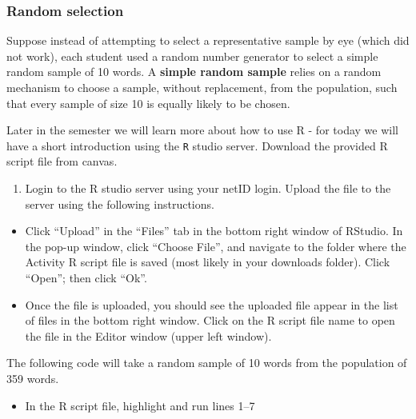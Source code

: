 \documentclass[
]{report}
\newenvironment{Shaded}{\begin{snugshade}}{\end{snugshade}}
\newcommand{\DecValTok}[1]{\textcolor[rgb]{0.00,0.00,0.81}{#1}}
\newcommand{\FunctionTok}[1]{\textcolor[rgb]{0.13,0.29,0.53}{\textbf{#1}}}
\newcommand{\NormalTok}[1]{#1}
\newcommand{\SpecialCharTok}[1]{\textcolor[rgb]{0.81,0.36,0.00}{\textbf{#1}}}
\providecommand{\tightlist}{%
  \setlength{\itemsep}{0pt}\setlength{\parskip}{0pt}}
\begin{document}
\subsubsection*{Random selection}\label{random-selection}

Suppose instead of attempting to select a representative sample by eye (which did not work), each student used a random number generator to select a simple random sample of 10 words. A \textbf{simple random sample} relies on a random mechanism to choose a sample, without replacement, from the population, such that every sample of size 10 is equally likely to be chosen.

Later in the semester we will learn more about how to use R - for today we will have a short introduction using the \texttt{R} studio server. Download the provided R script file from canvas.

\begin{enumerate}
\def\labelenumi{\arabic{enumi}.}
\setcounter{enumi}{4}
\tightlist
\item
  Login to the R studio server using your netID login. Upload the file to the server using the following instructions.
\end{enumerate}

\begin{itemize}
\item
  Click ``Upload'' in the ``Files'' tab in the bottom right window of RStudio. In the pop-up window, click ``Choose File'', and navigate to the folder where the Activity R script file is saved (most likely in your downloads folder). Click ``Open''; then click ``Ok''.
\item
  Once the file is uploaded, you should see the uploaded file appear in the list of files in the bottom right window. Click on the R script file name to open the file in the Editor window (upper left window).
\end{itemize}

The following code will take a random sample of 10 words from the population of 359 words.

\begin{itemize}
\tightlist
\item
  In the R script file, highlight and run lines 1--7
\end{itemize}

\begin{Shaded}
\end{Shaded}
\end{document}

